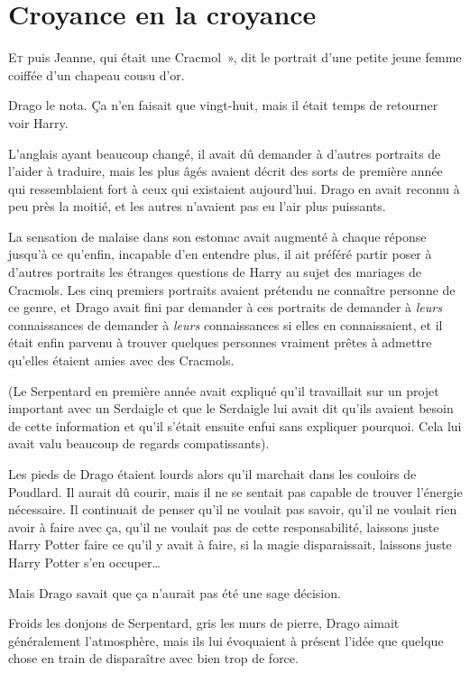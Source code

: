 \chapter{Croyance en la croyance}

\lettrine[ante=«~]{E}{t} puis Jeanne, qui était une Cracmol~», dit le portrait d'une petite jeune femme coiffée d'un chapeau cousu d'or.

Drago le nota. Ça n'en faisait que vingt-huit, mais il était temps de retourner voir Harry.

L'anglais ayant beaucoup changé, il avait dû demander à d'autres portraits de l'aider à traduire, mais les plus âgés avaient décrit des sorts de première année qui ressemblaient fort à ceux qui existaient aujourd'hui. Drago en avait reconnu à peu près la moitié, et les autres n'avaient pas eu l'air plus puissants.

La sensation de malaise dans son estomac avait augmenté à chaque réponse jusqu'à ce qu'enfin, incapable d'en entendre plus, il ait préféré partir poser à d'autres portraits les étranges questions de Harry au sujet des mariages de Cracmols. Les cinq premiers portraits avaient prétendu ne connaître personne de ce genre, et Drago avait fini par demander à ces portraits de demander à \emph{leurs} connaissances de demander à \emph{leurs} connaissances si elles en connaissaient, et il était enfin parvenu à trouver quelques personnes vraiment prêtes à admettre qu'elles étaient amies avec des Cracmols.

(Le Serpentard en première année avait expliqué qu'il travaillait sur un projet important avec un Serdaigle et que le Serdaigle lui avait dit qu'ils avaient besoin de cette information et qu'il s'était ensuite enfui sans expliquer pourquoi. Cela lui avait valu beaucoup de regards compatissants).

Les pieds de Drago étaient lourds alors qu'il marchait dans les couloirs de Poudlard. Il aurait dû courir, mais il ne se sentait pas capable de trouver l'énergie nécessaire. Il continuait de penser qu'il ne voulait pas savoir, qu'il ne voulait rien avoir à faire avec ça, qu'il ne voulait pas de cette responsabilité, laissons juste Harry Potter faire ce qu'il y avait à faire, si la magie disparaissait, laissons juste Harry Potter s'en occuper…

Mais Drago savait que ça n'aurait pas été une sage décision.

Froids les donjons de Serpentard, gris les murs de pierre, Drago aimait généralement l'atmosphère, mais ils lui évoquaient à présent l'idée que quelque chose en train de disparaître avec bien trop de force.

